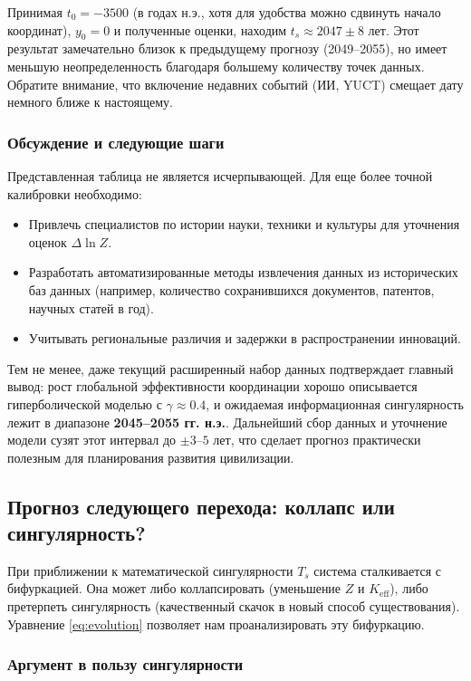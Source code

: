 \documentclass[12pt,a4paper]{article}
\theoremstyle{remark}
\begin{document}
	Принимая $t_0 = -3500$ (в годах н.э., хотя для удобства можно сдвинуть начало координат), $y_0 = 0$ и полученные оценки, находим $t_s \approx 2047 \pm 8$ лет. Этот результат замечательно близок к предыдущему прогнозу (2049–2055), но имеет меньшую неопределенность благодаря большему количеству точек данных. Обратите внимание, что включение недавних событий (ИИ, YUCT) смещает дату немного ближе к настоящему.
	
	\subsubsection{Обсуждение и следующие шаги}
	
	Представленная таблица не является исчерпывающей. Для еще более точной калибровки необходимо:
	\begin{itemize}
		\item Привлечь специалистов по истории науки, техники и культуры для уточнения оценок $\Delta \ln Z$.
		\item Разработать автоматизированные методы извлечения данных из исторических баз данных (например, количество сохранившихся документов, патентов, научных статей в год).
		\item Учитывать региональные различия и задержки в распространении инноваций.
	\end{itemize}
	Тем не менее, даже текущий расширенный набор данных подтверждает главный вывод: рост глобальной эффективности координации хорошо описывается гиперболической моделью с $\gamma \approx 0.4$, и ожидаемая информационная сингулярность лежит в диапазоне \textbf{2045–2055 гг. н.э.}. Дальнейший сбор данных и уточнение модели сузят этот интервал до $\pm 3$–$5$ лет, что сделает прогноз практически полезным для планирования развития цивилизации.
	
	\subsection{Прогноз следующего перехода: коллапс или сингулярность?}
	
	При приближении к математической сингулярности $T_s$ система сталкивается с бифуркацией. Она может либо коллапсировать (уменьшение $Z$ и $K_{\text{eff}}$), либо претерпеть сингулярность (качественный скачок в новый способ существования). Уравнение \ref{eq:evolution} позволяет нам проанализировать эту бифуркацию.
	
	\subsubsection{Аргумент в пользу сингулярности}
	
\end{document}

